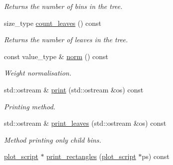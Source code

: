 \begin{DoxyCompactItemize}
\begin{DoxyCompactList}\small\item\em Returns the number of bins in the tree. \end{DoxyCompactList}\item 
\hypertarget{a00385_ac8c16489d879bd679d1c306824aa3730}{size\-\_\-type \hyperlink{a00385_ac8c16489d879bd679d1c306824aa3730}{count\-\_\-leaves} () const }\label{a00385_ac8c16489d879bd679d1c306824aa3730}

\begin{DoxyCompactList}\small\item\em Returns the number of leaves in the tree. \end{DoxyCompactList}\item 
\hypertarget{a00385_a3116ecf154176502f13244e906d2904a}{const value\-\_\-type \& \hyperlink{a00385_a3116ecf154176502f13244e906d2904a}{norm} () const }\label{a00385_a3116ecf154176502f13244e906d2904a}

\begin{DoxyCompactList}\small\item\em Weight normalisation. \end{DoxyCompactList}\item 
\hypertarget{a00385_aea7baabddaac111f4139df81f13690c4}{std\-::ostream \& \hyperlink{a00385_aea7baabddaac111f4139df81f13690c4}{print} (std\-::ostream \&os) const }\label{a00385_aea7baabddaac111f4139df81f13690c4}

\begin{DoxyCompactList}\small\item\em Printing method. \end{DoxyCompactList}\item 
\hypertarget{a00385_ad1fbf2b8cb14a62376f885314d196aad}{std\-::ostream \& \hyperlink{a00385_ad1fbf2b8cb14a62376f885314d196aad}{print\-\_\-leaves} (std\-::ostream \&os) const }\label{a00385_ad1fbf2b8cb14a62376f885314d196aad}

\begin{DoxyCompactList}\small\item\em Method printing only child bins. \end{DoxyCompactList}\item 
\hypertarget{a00385_a06c190bc0d84022e4286ff0a1bcd7f50}{\hyperlink{a00426}{plot\-\_\-script} $\ast$ \hyperlink{a00385_a06c190bc0d84022e4286ff0a1bcd7f50}{print\-\_\-rectangles} (\hyperlink{a00426}{plot\-\_\-script} $\ast$ps) const }\label{a00385_a06c190bc0d84022e4286ff0a1bcd7f50}


\end{DoxyCompactItemize}
